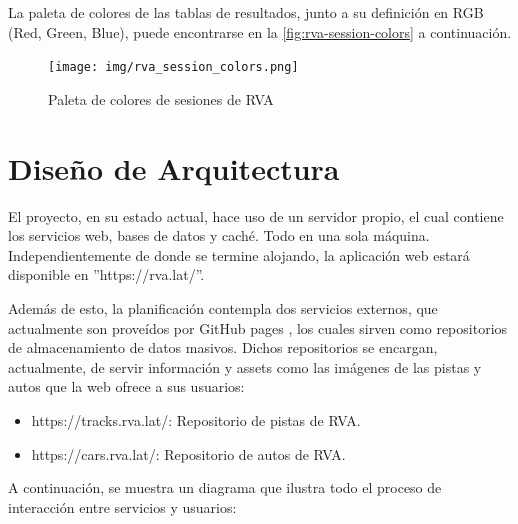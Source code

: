 La paleta de colores de las tablas de resultados, junto a su definición en RGB (Red, Green, Blue), puede encontrarse en la \autoref{fig:rva-session-colors} a continuación.

\begin{figure}[H]
  \begin{center}
    \texttt{[image: img/rva\_session\_colors.png]} 
  \end{center}
  \caption[Paleta de colores de sesiones de RVA]{Paleta de colores de sesiones de RVA}
  \label{fig:rva-session-colors}
\end{figure}

\newpage

\section{Diseño de Arquitectura}
El proyecto, en su estado actual, hace uso de un servidor propio, el cual contiene los servicios web, bases de datos y caché. Todo en una sola máquina. Independientemente de donde se termine alojando, la aplicación web estará disponible en ''https://rva.lat/''.

Además de esto, la planificación contempla dos servicios externos, que actualmente son proveídos por GitHub pages \cite{ghpages}, los cuales sirven como repositorios de almacenamiento de datos masivos. Dichos repositorios se encargan, actualmente, de servir información y assets como las imágenes de las pistas y autos que la web ofrece a sus usuarios:

\begin{itemize}
  \item https://tracks.rva.lat/: Repositorio de pistas de RVA.
  \item https://cars.rva.lat/: Repositorio de autos de RVA.
\end{itemize}

A continuación, se muestra un diagrama que ilustra todo el proceso de interacción entre servicios y usuarios:

